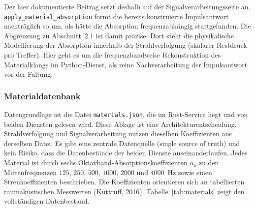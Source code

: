 Der hier dokumentierte Beitrag setzt deshalb auf der Signalverarbeitungsseite
an. \texttt{apply\_material\_absorption} formt die bereits konstruierte
Impulsantwort nachträglich so um, als hätte die Absorption frequenzabhängig
stattgefunden. Die Abgrenzung zu Abschnitt~2.1 ist damit präzise. Dort steht die
physikalische Modellierung der Absorption innerhalb der Strahlverfolgung
(skalarer Restdruck pro Treffer). Hier geht es um die frequenzbandweise
Rekonstruktion des Materialklangs im Python-Dienst, als reine Nachverarbeitung
der Impulsantwort vor der Faltung.

\subsubsection{Materialdatenbank}
\label{subsubsec:materialdb}

Datengrundlage ist die Datei \texttt{materials.json}, die im Rust-Service liegt
und von beiden Diensten gelesen wird. Diese Ablage ist eine
Architekturentscheidung. Strahlverfolgung und Signalverarbeitung nutzen dieselben
Koeffizienten aus derselben Datei. Es gibt eine zentrale Datenquelle (single
source of truth) und kein Risiko, dass die Datenbestände der beiden Dienste
auseinanderlaufen. Jedes Material ist durch sechs Oktavband-Absorptionskoeffizienten
$\alpha_b$ zu den Mittenfrequenzen $125$, $250$, $500$, $1000$, $2000$ und
$4000$~Hz sowie einen Streukoeffizienten beschrieben. Die Koeffizienten
orientieren sich an tabellierten raumakustischen Messwerten (Kuttruff, 2016).
Tabelle~\ref{tab:materials} zeigt den vollständigen Datenbestand.

